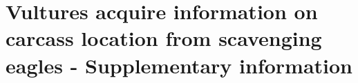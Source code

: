 \chapter{Vultures acquire information on carcass location from scavenging eagles - Supplementary information}
\label{chap:scrounger}

\begin{table}[H]
\small %
		\caption[Description of parameters used in the game theory model] %
				{Description of parameters used in the game theory model} 
		
		\label{tab:game_tab}
	\end{table}

	\newpage




%


%


%


%


%


%

